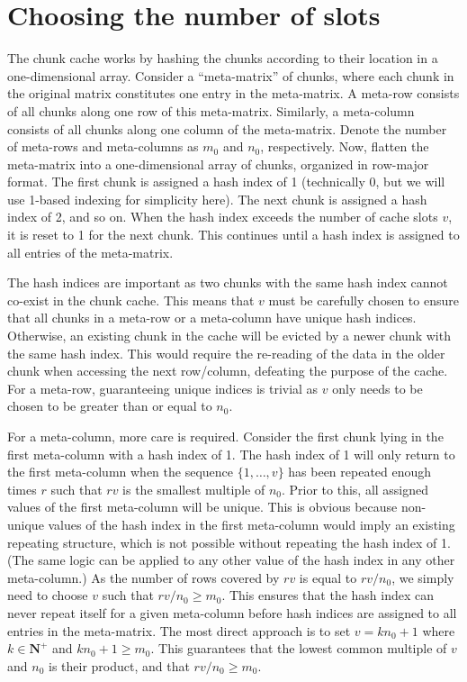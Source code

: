 \documentclass{article}
\begin{document}

\section{Choosing the number of slots}
\label{sec:slotchoice}
The chunk cache works by hashing the chunks according to their location in a one-dimensional array.
Consider a ``meta-matrix'' of chunks, where each chunk in the original matrix constitutes one entry in the meta-matrix.
A meta-row consists of all chunks along one row of this meta-matrix.
Similarly, a meta-column consists of all chunks along one column of the meta-matrix. 
Denote the number of meta-rows and meta-columns as $m_0$ and $n_0$, respectively.
Now, flatten the meta-matrix into a one-dimensional array of chunks, organized in row-major format.
The first chunk is assigned a hash index of 1 (technically 0, but we will use 1-based indexing for simplicity here).
The next chunk is assigned a hash index of 2, and so on.
When the hash index exceeds the number of cache slots $v$, it is reset to 1 for the next chunk.
This continues until a hash index is assigned to all entries of the meta-matrix.

The hash indices are important as two chunks with the same hash index cannot co-exist in the chunk cache.
This means that $v$ must be carefully chosen to ensure that all chunks in a meta-row or a meta-column have unique hash indices.
Otherwise, an existing chunk in the cache will be evicted by a newer chunk with the same hash index.
This would require the re-reading of the data in the older chunk when accessing the next row/column, defeating the purpose of the cache.
For a meta-row, guaranteeing unique indices is trivial as $v$ only needs to be chosen to be greater than or equal to $n_0$.

For a meta-column, more care is required.
Consider the first chunk lying in the first meta-column with a hash index of 1.
The hash index of 1 will only return to the first meta-column when the sequence $\{1, \ldots, v\}$ has been repeated enough times $r$ such that $rv$ is the smallest multiple of $n_0$.
Prior to this, all assigned values of the first meta-column will be unique.
This is obvious because non-unique values of the hash index in the first meta-column would imply an existing repeating structure, which is not possible without repeating the hash index of 1.
(The same logic can be applied to any other value of the hash index in any other meta-column.)
As the number of rows covered by $rv$ is equal to $rv/n_0$, we simply need to choose $v$ such that $rv/n_0 \ge m_0$.
This ensures that the hash index can never repeat itself for a given meta-column before hash indices are assigned to all entries in the meta-matrix.
The most direct approach is to set $v = kn_0 + 1$  where $k \in \mathbf{N}^+$ and $kn_0 +1 \ge m_0$.
This guarantees that the lowest common multiple of $v$ and $n_0$ is their product, and that $rv/n_0 \ge m_0$.
\end{document}
